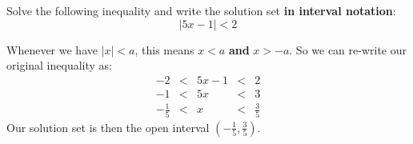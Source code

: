 \documentclass {article}
\newenvironment{prob}[2][]{\begin{trivlist}
\item[\hskip \labelsep {\bfseries #1}\hskip \labelsep {\bfseries #2.}]}{\end{trivlist}}
\begin{document}
\vspace {1cm}

\begin {prob}{5}
    Solve the following inequality and write the solution set \textbf{in interval notation}:
    \[ \left| 5x - 1 \right| < 2 \]
\end {prob}
Whenever we have $|x| < a$, this means $x < a$ \textbf{and} $x > -a$. So we can re-write our original inequality as:
\[
    \begin {array} {ccccc}
        -2 &<& 5x - 1 &<& 2 \\
        -1 &<& 5x &<& 3 \\
        -\frac{1}{5} &<& x &<& \frac{3}{5} 
    \end {array}
\]
Our solution set is then the open interval $\left( -\frac{1}{5}, \frac{3}{5} \right)$.
\end{document}
